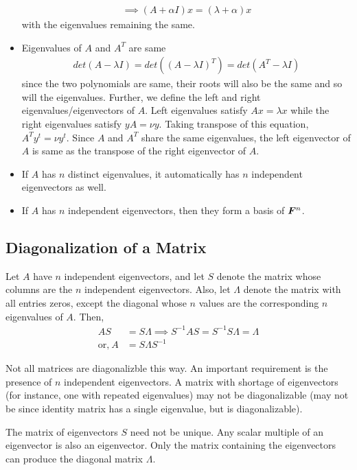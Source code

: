 \documentclass[../../linear_algebra.tex]{subfiles}
\begin{document}
\begin{itemize}
\begin{align*}
        \implies (A + \alpha I)x = (\lambda + \alpha)x
    \end{align*}
    with the eigenvalues remaining the same.
    \item Eigenvalues of $A$ and $A^{T}$ are same
    \begin{align*}
        det(A - \lambda I) = det((A - \lambda I)^{T}) = det(A^{T} - \lambda I)
    \end{align*}
    since the two polynomials are same, their roots will also be the same and so will the eigenvalues. Further, we define the left and right eigenvalues/eigenvectors of $A$. Left eigenvalues satisfy $Ax = \lambda x$ while the right eigenvalues satisfy $yA = \nu y$. Taking transpose of this equation, $A^{T}y^{t} = \nu y^{t}$. Since $A$ and $A^{T}$ share the same eigenvalues, the left eigenvector of $A$ is same as the transpose of the right eigenvector of $A$.
    \item If $A$ has $n$ distinct eigenvalues, it automatically has $n$ independent eigenvectors as well.
    \item If $A$ has $n$ independent eigenvectors, then they form a basis of $\bm{F}^{n}$.
\end{itemize}

\subsection{Diagonalization of a Matrix}
Let $A$ have $n$ independent eigenvectors, and let $S$ denote the matrix whose columns are the $n$ independent eigenvectors. Also, let $\Lambda$ denote the matrix with all entries zeros, except the diagonal whose $n$ values are the corresponding $n$ eigenvalues of $A$. Then,
\begin{align*}
    AS &= S\Lambda \implies S^{-1}AS = S^{-1}S\Lambda = \Lambda\\
    \text{or,} \: A &= S \Lambda S^{-1}
\end{align*}

Not all matrices are diagonalizble this way. An important requirement is the presence of $n$ independent eigenvectors. A matrix with shortage of eigenvectors (for instance, one with repeated eigenvalues) may not be diagonalizable (may not be since identity matrix has a single eigenvalue, but is diagonalizable).\newline

The matrix of eigenvectors $S$ need not be unique. Any scalar multiple of an eigenvector is also an eigenvector. Only the matrix containing the eigenvectors can produce the diagonal matrix $\Lambda$.\newline
\end{document}
